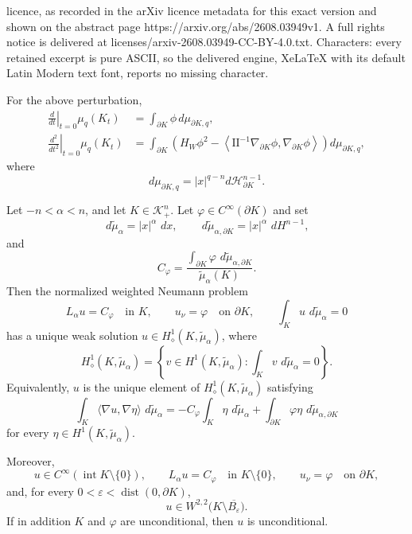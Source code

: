 \documentclass[10pt,a4paper]{amsart}
\newcommand{\II}{\mathrm{II}}
\newcommand{\cH}{\mathcal{H}}
\newcommand{\dd}{\,d}
\begin{document}
licence, as recorded in the arXiv licence metadata for this exact version and shown on the abstract page https://arxiv.org/abs/2608.03949v1. A full rights notice is delivered at licenses/arxiv-2608.03949-CC-BY-4.0.txt. Characters: every retained excerpt is pure ASCII, so the delivered engine, XeLaTeX with its default Latin Modern text font, reports no missing character.
\begin{lem}\label{lem-variation}
For the above perturbation,
\begin{align}
    \left.\frac{d}{dt}\right|_{t=0}\mu_q(K_t)
    &=\int_{\partial K}\phi\,d\mu_{\partial K,q},\\
    \left.\frac{d^2}{dt^2}\right|_{t=0}\mu_q(K_t)
    &=\int_{\partial K}\left(H_W\phi^2-\left\langle \II^{-1}\nabla_{\partial K}\phi,\nabla_{\partial K}\phi\right\rangle\right)d\mu_{\partial K,q},
\end{align}
where
\[
    d\mu_{\partial K,q}=|x|^{q-n}d\cH^{n-1}_{\partial K}.
\]
\end{lem}

\begin{lem}\label{lem-neumann}
  Let $-n<\alpha<n$, and let $K\in\mathcal{K}_{+}^n$. Let
  $\varphi\in C^\infty(\partial K)$ and set
  \[
    \dd\tilde{\mu}_\alpha=|x|^\alpha\,\dd x,
    \qquad
    \dd\tilde{\mu}_{\alpha,\partial K}
    =
    |x|^\alpha\,\dd H^{n-1},
  \]
  and
  \[
    C_\varphi
    =
    \frac{
      \int_{\partial K}\varphi\,\dd\tilde{\mu}_{\alpha,\partial K}}
    {      \tilde{\mu}_\alpha(K)}.
  \]
  Then the normalized weighted Neumann problem
  \[
    L_\alpha u=C_\varphi\quad\text{in }K,
    \qquad
    u_\nu=\varphi\quad\text{on }\partial K,
    \qquad
    \int_K u\,\dd\tilde{\mu}_\alpha=0
  \]
  has a unique weak solution
  $u\in H^1_\diamond(K,\tilde{\mu}_\alpha)$, where
  \[
    H^1_\diamond(K,\tilde{\mu}_\alpha)
    =
    \left\{
      v\in H^1(K,\tilde{\mu}_\alpha):
      \int_K v\,\dd\tilde{\mu}_\alpha=0
    \right\}.
  \]
  Equivalently, $u$ is the unique element of
  $H^1_\diamond(K,\tilde{\mu}_\alpha)$ satisfying
  \begin{equation}\label{eq-neumann-weak}
    \int_K\langle\nabla u,\nabla\eta\rangle\,
    \dd\tilde{\mu}_\alpha
    =
    -C_\varphi\int_K\eta\,\dd\tilde{\mu}_\alpha
    +
    \int_{\partial K}\varphi\eta\,
    \dd\tilde{\mu}_{\alpha,\partial K}
  \end{equation}
  for every $\eta\in H^1(K,\tilde{\mu}_\alpha)$.

    Moreover,
  \[
    u\in C^\infty(\operatorname{int}K\setminus\{0\}),
    \qquad
    L_\alpha u=C_\varphi\quad\text{in }K\setminus\{0\},
    \qquad
    u_\nu=\varphi\quad\text{on }\partial K,
  \]
  and, for every $0<\varepsilon<\operatorname{dist}(0,\partial K)$,
  \[
    u\in W^{2,2}\bigl(K\setminus\overline{B_\varepsilon}\bigr).
  \]
  If in addition $K$ and $\varphi$ are unconditional, then $u$ is
  unconditional.
\end{lem}
\end{document}
